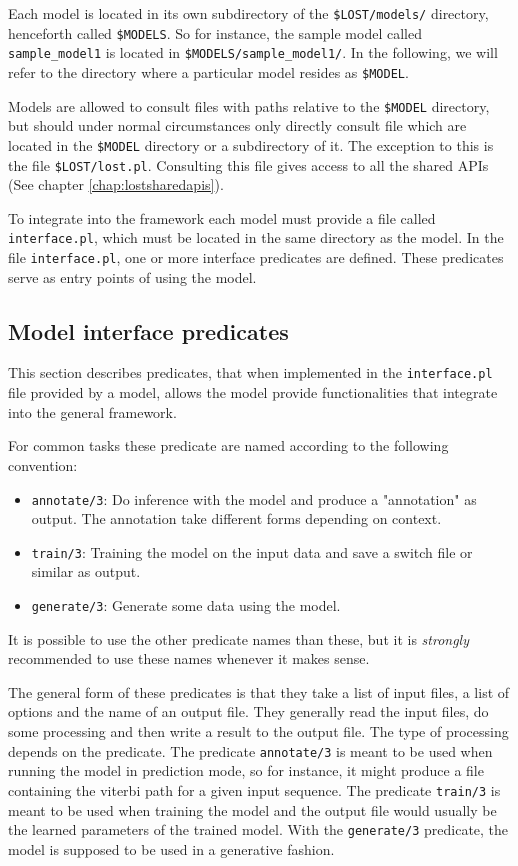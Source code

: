\documentclass{book}
\begin{document}
Each model is located in its own subdirectory of the 
\texttt{\$LOST/models/} directory, henceforth called \texttt{\$MODELS}. 
So for instance, the sample model called \texttt{sample\_model1} is located in
\texttt{\$MODELS/sample\_model1/}. In the following, we will refer to the directory 
where a particular model resides as \texttt{\$MODEL}.

Models are allowed to consult files with paths relative to the
\texttt{\$MODEL} directory, but should under normal circumstances
only directly consult file which are located in the 
\texttt{\$MODEL} directory or a subdirectory of it.
The exception to this is the file \texttt{\$LOST/lost.pl}. Consulting
this file gives access to all the shared APIs (See chapter \ref{chap:lostsharedapis}).

To integrate into the framework each model must provide a file called
\texttt{interface.pl}, which must be located in the same directory as
the model. In the file \texttt{interface.pl}, one or more interface
predicates are defined.  These predicates serve as entry points of
using the model. 

\subsection{Model interface predicates}

This section describes predicates, that when implemented in 
the \texttt{interface.pl} file provided by a model, allows the 
model provide functionalities that integrate into the general framework.

For common tasks these predicate are named according to the
following convention:
\begin{itemize}
\item \texttt{annotate/3}: Do inference with the model and produce a
  "annotation" as output. The annotation take different forms depending on context.
\item \texttt{train/3}: Training the model on the input data and save
  a switch file or similar as output.
\item \texttt{generate/3}: Generate some data using the model.
\end{itemize}

It is possible to use the other predicate names than these, but it is 
\emph{strongly} recommended to use these names whenever it makes
sense.

The general form of these predicates is that they take a list of
input files, a list of options and the name of an output file. They 
generally read the input files, do some processing and then write
a result to the output file. The type of processing depends on the
predicate. The predicate \texttt{annotate/3} is meant to
be used when running the model in prediction mode, so for instance, it 
might produce a file containing the viterbi path for a given input
sequence. The predicate \texttt{train/3} is meant to be used when 
training the model and the output file would usually be the learned
parameters of the trained model. With the \texttt{generate/3}
predicate, the model is supposed to be used in a generative fashion.
\end{document}
